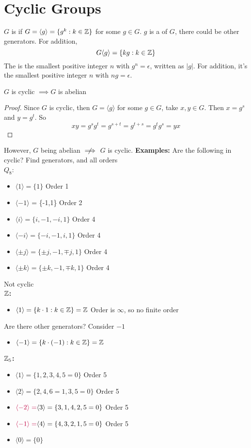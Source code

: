 \documentclass[openany]{report}
\begin{document}
\section{Cyclic Groups}
$G$ is  if $G = \langle g \rangle = \{g^k: k\in \mathbb{Z}\}$ for some $g \in G$. $g$ is a  of $G$, there could be other generators. 
For addition, 
$$G \langle g \rangle = \{kg : k \in \mathbb{Z} \}$$
The  is the smallest positive integer $n$ with $g^n = \epsilon$, written as $|g|$. For addition, it's the smallest positive integer $n$ with $ng = \epsilon$.
\begin{prop}
    $G$ is cyclic $\implies G$ is abelian
\end{prop}
\begin{proof}
    Since $G$ is cyclic, then $G = \langle g \rangle$ for some $g \in G$, take $x,y \in G$. Then $x = g^s$ and $y = g^t$. So
    $$xy = g^sg^t = g^{s+t} = g^{t+s} = g^tg^s = yx$$
\end{proof}
However, $G$ being abelian $\notimplies$ $G$ is cyclic.
\textbf{Examples:} Are the following  in cyclic? Find generators, and all orders\\[2ex]
\textbf{ $Q_8$}:
\begin{itemize}
    \item $\langle 1 \rangle = \{1\}$ Order 1
    \item $\langle -1 \rangle$ = \{-1,1\} Order 2
    \item $\langle i \rangle = \{i, -1, -i, 1\}$ Order 4
    \item $\langle -i \rangle = \{-i, -1, i, 1\}$ Order 4
    \item $\langle \pm j \rangle = \{\pm j, -1, \mp j, 1\}$ Order 4
    \item $\langle \pm k \rangle = \{\pm k, -1, \mp k, 1\}$ Order 4
\end{itemize}
Not cyclic\\[2ex]
\textbf{$\mathbb{Z}$:}
\begin{itemize}
    \item $\langle 1 \rangle = \{k \cdot 1 : k \in \mathbb{Z} \} = \mathbb{Z}$ Order is $\infty$, so no finite order 
\end{itemize}
Are there other generators? Consider $-1$
\begin{itemize}
    \item $\langle -1 \rangle = \{k \cdot (-1) : k \in \mathbb{Z} \} = \mathbb{Z}$
\end{itemize}
\textbf{$\mathbb{Z}_5$:}
\begin{itemize}
    \item $\langle 1 \rangle = \{1,2,3,4,5=0\}$ Order 5
    \item $\langle 2 \rangle = \{2,4,6=1,3,5=0\}$ Order 5
    \item $\textcolor{purple}{\langle -2 \rangle = } \langle 3 \rangle = \{3,1,4,2,5=0\}$ Order 5
    \item $\textcolor{purple}{\langle -1 \rangle = }\langle 4 \rangle = \{4,3,2,1,5=0\}$ Order 5
    \item $\langle 0 \rangle = \{0\}$
\end{itemize}
\end{document}
